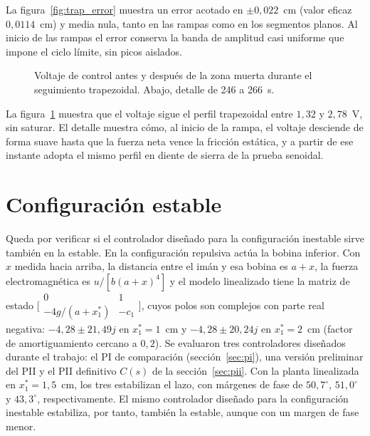 La figura~\ref{fig:trap_error} muestra un error acotado en $\pm 0{,}022$~cm (valor eficaz $0{,}0114$~cm) y media nula, tanto en las rampas como en los segmentos planos. Al inicio de las rampas el error conserva la banda de amplitud casi uniforme que impone el ciclo límite, sin picos aislados.

\FloatBarrier

\begin{figure}[ht]
    \centering
    
    \caption[Seguimiento trapezoidal: señal de control]{Voltaje de control antes y después de la zona muerta durante el seguimiento trapezoidal. Abajo, detalle de 246 a 266~s.}
    \label{fig:trap_ctrl}
\end{figure}

La figura~\ref{fig:trap_ctrl} muestra que el voltaje sigue el perfil trapezoidal entre $1{,}32$ y $2{,}78$~V, sin saturar. El detalle muestra cómo, al inicio de la rampa, el voltaje desciende de forma suave hasta que la fuerza neta vence la fricción estática, y a partir de ese instante adopta el mismo perfil en diente de sierra de la prueba senoidal.

\FloatBarrier

\section{Configuración estable}

Queda por verificar si el controlador diseñado para la configuración inestable sirve también en la estable. En la configuración repulsiva actúa la bobina inferior. Con $x$ medida hacia arriba, la distancia entre el imán y esa bobina es $a+x$, la fuerza electromagnética es $u/[b(a+x)^4]$ y el modelo linealizado tiene la matriz de estado $\bigl[\begin{smallmatrix}0&1\\-4g/(a+x_1^*)&-c_1\end{smallmatrix}\bigr]$, cuyos polos son complejos con parte real negativa: $-4{,}28\pm21{,}49j$ en $x_1^*=1$~cm y $-4{,}28\pm20{,}24j$ en $x_1^*=2$~cm (factor de amortiguamiento cercano a $0{,}2$). Se evaluaron tres controladores diseñados durante el trabajo: el PI de comparación (sección~\ref{sec:pi}), una versión preliminar del PII y el PII definitivo $C(s)$ de la sección~\ref{sec:pii}. Con la planta linealizada en $x_1^*=1{,}5$~cm, los tres estabilizan el lazo, con márgenes de fase de $50{,}7^\circ$, $51{,}0^\circ$ y $43{,}3^\circ$, respectivamente. El mismo controlador diseñado para la configuración inestable estabiliza, por tanto, también la estable, aunque con un margen de fase menor.

